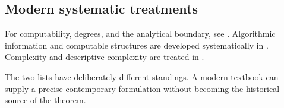\subsection*{Modern systematic treatments}

For computability, degrees, and the analytical boundary, see
\cite{Rogers1967,Soare2016,Moschovakis2016Hyperarithmetical}.  Algorithmic
information and computable structures are developed systematically in
\cite{LiVitanyi2008,AshKnight2000}.  Complexity and descriptive complexity
are treated in \cite{Papadimitriou1994,AroraBarak2009,Immerman1999}.

The two lists have deliberately different standings.  A modern textbook can
supply a precise contemporary formulation without becoming the historical
source of the theorem.

